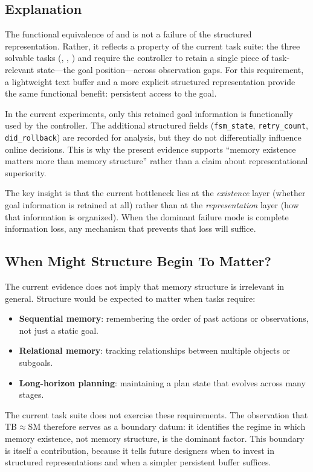 \subsection{Explanation}

The functional equivalence of  and  is not a failure of the structured representation. Rather, it reflects a property of the current task suite: the three solvable tasks (, , ) and  require the controller to retain a single piece of task-relevant state---the goal position---across observation gaps. For this requirement, a lightweight text buffer and a more explicit structured representation provide the same functional benefit: persistent access to the goal.

In the current experiments, only this retained goal information is functionally used by the controller. The additional structured fields (\texttt{fsm\_state}, \texttt{retry\_count}, \texttt{did\_rollback}) are recorded for analysis, but they do not differentially influence online decisions. This is why the present evidence supports ``memory existence matters more than memory structure'' rather than a claim about representational superiority.

The key insight is that the current bottleneck lies at the \emph{existence} layer (whether goal information is retained at all) rather than at the \emph{representation} layer (how that information is organized). When the dominant failure mode is complete information loss, any mechanism that prevents that loss will suffice.

\subsection{When Might Structure Begin To Matter?}

The current evidence does not imply that memory structure is irrelevant in general. Structure would be expected to matter when tasks require:

\begin{itemize}
\item \textbf{Sequential memory}: remembering the order of past actions or observations, not just a static goal.
\item \textbf{Relational memory}: tracking relationships between multiple objects or subgoals.
\item \textbf{Long-horizon planning}: maintaining a plan state that evolves across many stages.
\end{itemize}

The current task suite does not exercise these requirements. The observation that TB$\approx$SM therefore serves as a boundary datum: it identifies the regime in which memory existence, not memory structure, is the dominant factor. This boundary is itself a contribution, because it tells future designers when to invest in structured representations and when a simpler persistent buffer suffices.
